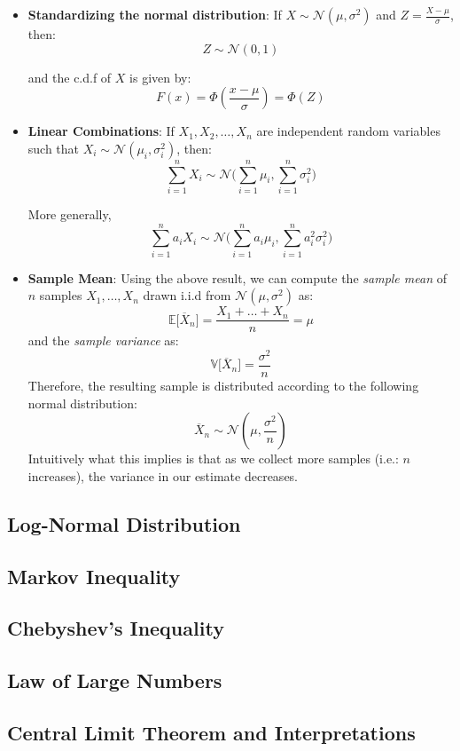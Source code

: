 \documentclass[english, 11pt]{article}
\begin{document}
\begin{itemize}
\item {\bf Standardizing the normal distribution}: If $X \sim \mathcal{N} (\mu, \sigma^2)$ and $Z = \frac{X-\mu}{\sigma}$, then:
\[ Z \sim \mathcal{N} (0, 1) \] 

and the c.d.f of $X$ is given by:
\[ F(x) = \Phi(\frac{x-\mu}{\sigma}) = \Phi(Z) \]

\item {\bf Linear Combinations}: If $X_1, X_2, \ldots, X_n$ are independent random variables such that $X_i \sim \mathcal{N} (\mu_i, \sigma_i^2)$, then:
\[ \sum_{i=1}^{n} X_i \sim \mathcal{N} \bigg(\sum_{i=1}^{n} \mu_i, \sum_{i=1}^{n} \sigma_i^2 \bigg) \]

More generally,
\[ \sum_{i=1}^{n} a_i X_i \sim \mathcal{N} \bigg( \sum_{i=1}^{n} a_i \mu_i, \sum_{i=1}^{n} a_i^2 \sigma_i^2 \bigg) \]

\item {\bf Sample Mean}: Using the above result, we can compute the {\it sample mean} of $n$ samples $X_1, \ldots, X_n$ drawn i.i.d from $\mathcal{N} (\mu, \sigma^2)$ as:
\[ \mathbb{E} \big[ \overline{X}_n \big] = \frac{X_1 + \ldots + X_n}{n} = \mu \]
and the {\it sample variance} as:
\[ \mathbb{V} \big[ \overline{X}_n \big] = \frac{\sigma^2}{n} \]
Therefore, the resulting sample is distributed according to the following normal distribution:
\[ \overline{X}_n \sim \mathcal{N} (\mu, \frac{\sigma^2}{n}) \]
Intuitively what this implies is that as we collect more samples (i.e.: $n$ increases), the variance in our estimate decreases.
\end{itemize}

\subsection{Log-Normal Distribution}

\subsection{Markov Inequality}

\subsection{Chebyshev's Inequality}

\subsection{Law of Large Numbers}

\subsection{Central Limit Theorem and Interpretations}
\end{document}
